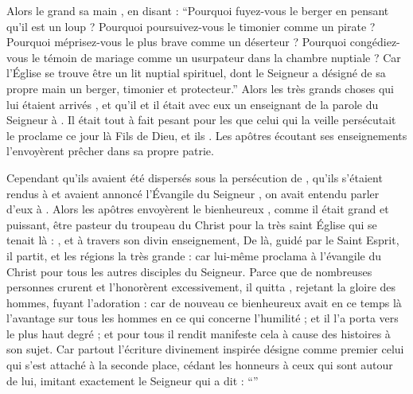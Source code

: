 Alors le grand  sa main , en disant :
\enquote{Pourquoi fuyez-vous le berger en pensant qu'il est un loup ?
Pourquoi poursuivez-vous le timonier comme un pirate ? %
Pourquoi méprisez-vous le plus brave comme un déserteur ?
Pourquoi congédiez-vous le témoin de mariage comme un usurpateur dans la chambre nuptiale ?  %
Car l'Église se trouve être un lit nuptial spirituel, dont le Seigneur a désigné de sa propre main un  berger, timonier et protecteur.}  %
Alors    les  très  grands choses qui lui étaient arrivés , et qu'il  et il était avec eux un enseignant de la parole du Seigneur à .
Il était tout à fait pesant pour les  que celui qui la veille persécutait  le proclame ce jour là Fils de Dieu, et ils  . 
Les apôtres écoutant ses enseignements l'envoyèrent prêcher dans sa propre patrie. %

Cependant qu'ils avaient été dispersés sous la persécution de , qu'ils  s'étaient rendus à  et avaient annoncé l'Évangile du Seigneur , on avait entendu parler %
d'eux à . %
Alors les apôtres envoyèrent  le bienheureux , comme il était grand et puissant, être pasteur du troupeau du Christ pour la très saint Église qui se tenait là : , et à travers son divin enseignement, 
De là, guidé par le Saint Esprit, il partit,  et les régions  la très grande  : car lui-même proclama à  l'évangile du Christ pour tous les autres disciples du Seigneur. 
Parce que de nombreuses personnes crurent et l'honorèrent excessivement, il quitta , rejetant la gloire des hommes, fuyant l'adoration : car de nouveau ce bienheureux avait en ce temps là l'avantage sur tous les hommes en ce qui concerne l'humilité ; et il l'a porta vers le plus haut degré ; et pour tous il rendit manifeste cela  à cause des histoires à son sujet. 
Car partout l'écriture divinement inspirée désigne comme  premier celui qui  s'est attaché à la seconde place, cédant les honneurs à ceux qui sont autour de lui,
imitant exactement le Seigneur qui a dit : \enquote{} %

